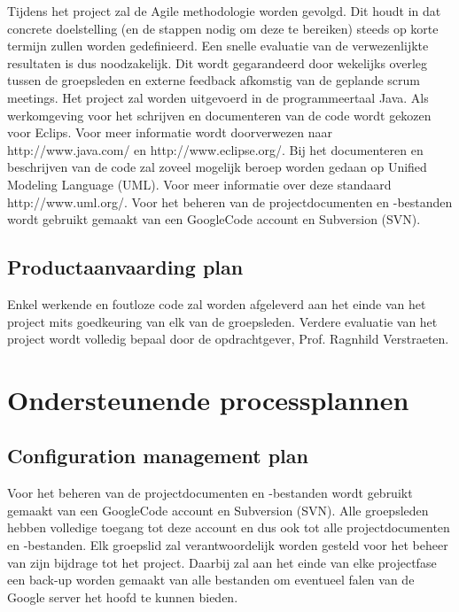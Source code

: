 \documentclass{article}
\begin{document}
Tijdens het project zal de Agile methodologie worden gevolgd. Dit houdt in dat concrete doelstelling (en de stappen nodig om deze te bereiken) steeds op korte termijn zullen worden gedefinieerd. Een snelle evaluatie van de verwezenlijkte resultaten is dus noodzakelijk. Dit wordt gegarandeerd door wekelijks overleg tussen de groepsleden en externe feedback afkomstig van de geplande scrum meetings.
Het project zal worden uitgevoerd in de programmeertaal Java. Als werkomgeving voor het schrijven en documenteren van de code wordt gekozen voor Eclips. Voor meer informatie wordt doorverwezen naar http://www.java.com/ en http://www.eclipse.org/.
Bij het documenteren en beschrijven van de code zal zoveel mogelijk beroep worden gedaan op Unified Modeling Language (UML). Voor meer informatie over deze standaard http://www.uml.org/. Voor het beheren van de projectdocumenten en -bestanden wordt gebruikt gemaakt van een GoogleCode account en Subversion (SVN).


\subsection{Productaanvaarding plan}

Enkel werkende en foutloze code zal worden afgeleverd aan het einde van het project mits goedkeuring van elk van de groepsleden. Verdere evaluatie van het project wordt volledig bepaal door de opdrachtgever, Prof. Ragnhild Verstraeten.

\newpage
\section{Ondersteunende processplannen}
\subsection{Configuration management plan}

Voor het beheren van de projectdocumenten en -bestanden wordt gebruikt gemaakt van een GoogleCode account en Subversion (SVN). Alle groepsleden hebben volledige toegang tot deze account en dus ook tot alle projectdocumenten en -bestanden. Elk groepslid zal verantwoordelijk worden gesteld voor het beheer van zijn bijdrage tot het project. Daarbij zal aan het einde van elke projectfase een back-up worden gemaakt van alle bestanden om eventueel falen van de Google server het hoofd te kunnen bieden.
\end{document}
